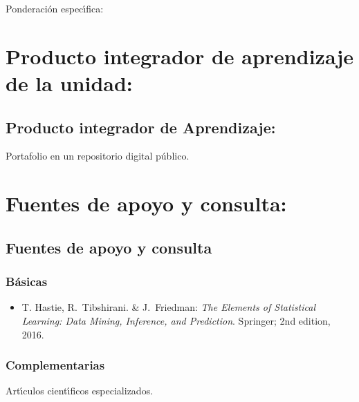 \documentclass[10 pt]{article}
\begin{document}
Ponderaci\'{o}n espec\'{\i}fica:


\newpage

\section{Producto integrador de aprendizaje de la unidad:}
\subsection{Producto integrador de Aprendizaje:} Portafolio en un
repositorio digital p\'{u}blico. %

\section{Fuentes de apoyo y consulta:}
\subsection{Fuentes de apoyo y consulta}
\subsubsection{B\'{a}sicas}

\begin{itemize}[itemsep=0em]

  
\item{T. {\sc Hastie}, R.\ {\sc Tibshirani}. \& J.\ {\sc Friedman}: {\em
      The Elements of Statistical Learning: Data Mining, Inference,
      and Prediction}. Springer; 2nd edition, 2016.}
  
\end{itemize}

\subsubsection{Complementarias}

Art\'{\i}culos cient\'{\i}ficos especializados.

\label{final} %


\end{document}
